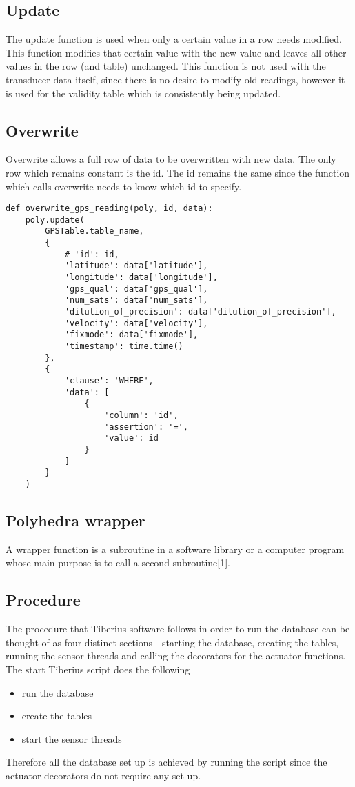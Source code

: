 \subsection{Update}
The update function is used when only a certain value in a row needs modified. This function modifies that certain value with the new value and leaves all other values in the row (and table) unchanged. This function is not used with the transducer data itself, since there is no desire to modify old readings, however it is used for the validity table which is consistently being updated. 


\subsection{Overwrite}
Overwrite allows a full row of data to be overwritten with new data. The only row which remains constant is the id. The id remains the same since the function which calls overwrite needs to know which id to specify. 

\begin{lstlisting}[style=custompython]
def overwrite_gps_reading(poly, id, data):
    poly.update(
        GPSTable.table_name,
        {
            # 'id': id,
            'latitude': data['latitude'],
            'longitude': data['longitude'],
            'gps_qual': data['gps_qual'],
            'num_sats': data['num_sats'],
            'dilution_of_precision': data['dilution_of_precision'],
            'velocity': data['velocity'],
            'fixmode': data['fixmode'],
            'timestamp': time.time()
        },
        {
            'clause': 'WHERE',
            'data': [
                {
                    'column': 'id',
                    'assertion': '=',
                    'value': id
                }
            ]
        }
    )
\end{lstlisting}

\subsection{Polyhedra wrapper}
A wrapper function is a subroutine in a software library or a computer program whose main purpose is to call a second subroutine[1]. 


\subsection{Procedure}
\label{database_process}
The procedure that Tiberius software follows in order to run the database can be thought of as four distinct sections - starting the database, creating the tables, running the sensor threads and calling the decorators for the actuator functions. 
\newline
The start Tiberius script does the following
\begin{itemize}
\item run the database
\item create the tables
\item start the sensor threads
\end{itemize} 
Therefore all the database set up is achieved by running the script since the actuator decorators do not require any set up.

